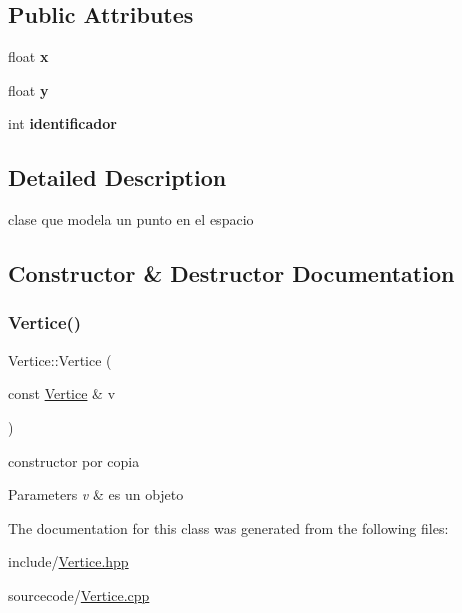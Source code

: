 \subsection*{Public Attributes}
\begin{DoxyCompactItemize}
\item 
\mbox{\label{class_vertice_abc7f97df103b9c53bf04e1c6f247c1fc}} 
float {\bfseries x}
\item 
\mbox{\label{class_vertice_aca05e79646b79df75ccf73f07b04d26e}} 
float {\bfseries y}
\item 
\mbox{\label{class_vertice_a923a1c1451729f490b42bbe35bdf20f1}} 
int {\bfseries identificador}
\end{DoxyCompactItemize}


\subsection{Detailed Description}
clase que modela un punto en el espacio 

\subsection{Constructor \& Destructor Documentation}
\mbox{\label{class_vertice_a8d8f3610b706a9e5d50e1138d9abea90}} 
\subsubsection{\texorpdfstring{Vertice()}{Vertice()}}
{\footnotesize\ttfamily Vertice\+::\+Vertice (\begin{DoxyParamCaption}\item[{const \hyperlink{class_vertice}{Vertice} \&}]{v }\end{DoxyParamCaption})}



constructor por copia 


\begin{DoxyParams}{Parameters}
{\em v} & es un objeto \\
\hline
\end{DoxyParams}


The documentation for this class was generated from the following files\+:\begin{DoxyCompactItemize}
\item 
include/\hyperlink{_vertice_8hpp}{Vertice.\+hpp}\item 
sourcecode/\hyperlink{_vertice_8cpp}{Vertice.\+cpp}\end{DoxyCompactItemize}
